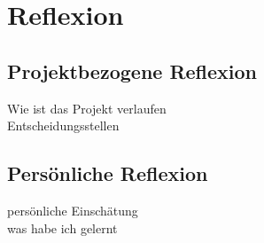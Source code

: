 
\chapter{Reflexion}
\section{Projektbezogene Reflexion}
Wie ist das Projekt verlaufen\\
Entscheidungsstellen\\

\section{Persönliche Reflexion}
persönliche Einschätung\\
was habe ich gelernt\\
